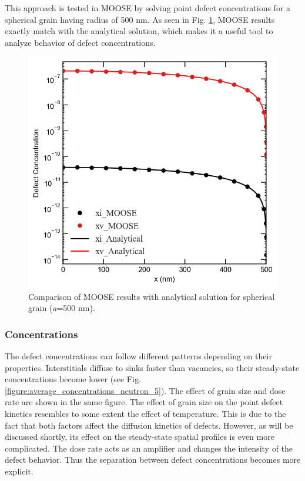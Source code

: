 \documentclass[a4paper]{article}
\begin{document}
  This approach is tested in MOOSE by solving point defect concentrations for a spherical grain having radius of 500 nm. As seen in Fig. \ref{figure:concentrations_MOOSE_analytical}, MOOSE results exactly match with the analytical solution, which makes it a useful tool to analyze behavior of defect concentrations.
  \begin{figure}[h!]
    \centering
    \includegraphics[scale=0.55]{concentration_profiles_MOOSE_Analytical_Neutron_0}
    \caption{Comparison of MOOSE results with analytical solution for spherical grain (\textit{a}=500 nm).}
    \label{figure:concentrations_MOOSE_analytical}
  \end{figure}
  \newpage
  \subsubsection{Concentrations} \hspace{10pt}
  The defect concentrations can follow different patterns depending on their properties. Interstitials diffuse to sinks faster than vacancies, so their steady-state concentrations become lower (see Fig. \ref{figure:average_concentrations_neutron_5}). The effect of grain size and dose rate are shown in the same figure. The effect of grain size on the point defect kinetics resembles to some extent the effect of temperature. This is due to the fact that both factors affect the diffusion kinetics of defects. However, as will be discussed shortly, its effect on the steady-state spatial profiles is even more complicated. The dose rate acts as an amplifier and changes the intensity of the defect behavior. Thus the separation between defect concentrations becomes more explicit.
\end{document}
